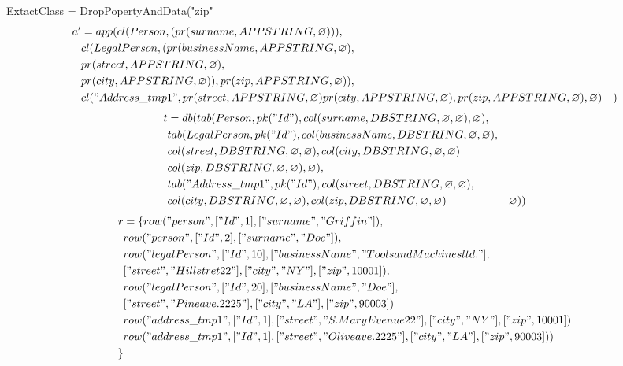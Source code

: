 \documentclass[11pt]{article}
\begin{document}
\newpage
ExtactClass = DropPopertyAndData("zip"
\begin{align*}
a' &= app(cl(Person, (pr(surname, APPSTRING, \varnothing))), \\
& cl(LegalPerson, (pr(businessName, APPSTRING, \varnothing), \\
& pr(street, APPSTRING, \varnothing), \\
& pr(city, APPSTRING, \varnothing)), pr(zip, APPSTRING, \varnothing)), \\
& cl("Address\_tmp1", pr(street, APPSTRING, \varnothing) pr(city, APPSTRING, \varnothing), pr(zip, APPSTRING, \varnothing), \varnothing)
& )
\end{align*}
\begin{align*}
t &= db(tab(Person, pk("Id"), col(surname, DBSTRING, \varnothing, \varnothing), \varnothing), \\
& tab(LegalPerson, pk("Id"),  col(businessName, DBSTRING, \varnothing, \varnothing), \\
& col(street, DBSTRING, \varnothing, \varnothing), col(city, DBSTRING, \varnothing, \varnothing) \\
& col(zip, DBSTRING, \varnothing, \varnothing), \varnothing), \\
& tab("Address\_tmp1", pk("Id"), col(street, DBSTRING, \varnothing, \varnothing),\\
& col(city, DBSTRING, \varnothing, \varnothing), col(zip, DBSTRING, \varnothing, \varnothing)
& \varnothing)) 
\end{align*}
\begin{align*}
r &= \{ row("person", ["Id", 1], ["surname", "Griffin"]), \\
& row("person", ["Id", 2], ["surname", "Doe"]), \\
& row("legalPerson", ["Id", 10], ["businessName", "Tools and Machines ltd."], \\
& ["street", "Hill stret 22"], ["city", "NY"], ["zip", 10001]), \\
& row("legalPerson", ["Id", 20], ["businessName", "Doe"], \\
& ["street", "Pine ave. 2225"], ["city", "LA"], ["zip", 90003])\\
& row("address\_tmp1", ["Id", 1], ["street", "S. Mary Evenue 22"], ["city", "NY"], ["zip", 10001]) \\
& row("address\_tmp1", ["Id", 1], ["street", "Olive ave. 2225"], ["city", "LA"], ["zip", 90003]) )\\
\}
\end{align*}
\end{document}
